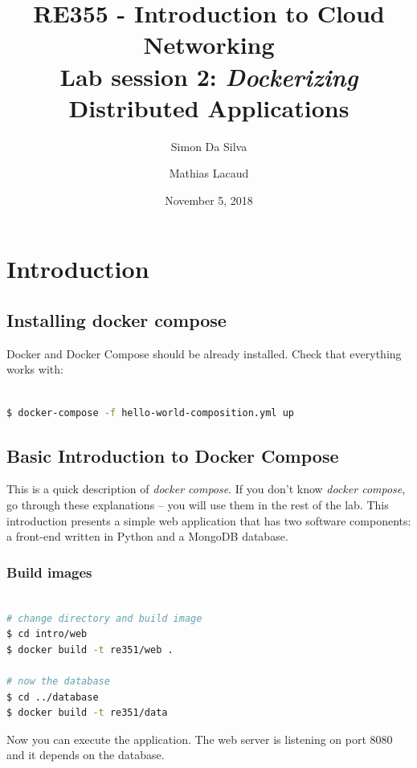 \documentclass[a4paper,11pt]{exam}
\date{November 5, 2018}
\title{RE355 - Introduction to Cloud Networking \\
Lab session 2: \textit{Dockerizing} Distributed Applications}
\author{Simon Da Silva \and Mathias Lacaud}
\begin{document}
\maketitle

\section{Introduction}

\subsection{Installing docker compose}

Docker and Docker Compose should be already installed. Check that everything works with:

\begin{lstlisting}[frame=single,language={sh}]  % Start your code-block

$ docker-compose -f hello-world-composition.yml up

\end{lstlisting}

\subsection{Basic Introduction to Docker Compose}

This is a quick description of \textit{docker compose}. If you don't know \textit{docker compose}, go through these explanations -- you will use them in the rest of the lab.
This introduction presents a simple web application that has two software components: a front-end written in Python and a MongoDB database.

\subsubsection*{Build images}

\begin{lstlisting}[frame=single,language={sh}]  % Start your code-block

# change directory and build image
$ cd intro/web
$ docker build -t re351/web .

# now the database
$ cd ../database
$ docker build -t re351/data

\end{lstlisting}

Now you can execute the application. The web server is listening on port 8080 and it depends on the database.
\end{document}
